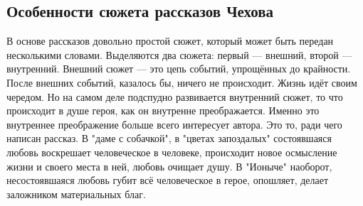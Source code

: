 \documentclass{article}
\begin{document}
\subsection{Особенности сюжета рассказов Чехова}

В основе рассказов довольно простой сюжет, который может быть передан несколькими словами. Выделяются два сюжета:
первый --- внешний, второй --- внутренний. Внешний сюжет --- это цепь событий, упрощённых до крайности. После внешних
событий, казалось бы, ничего не происходит. Жизнь идёт своим чередом. Но на самом деле подспудно развивается внутренний
сюжет, то что происходит в душе героя, как он внутренне преображается. Именно это внутреннее преображение больше всего
интересует автора. Это то, ради чего написан рассказ. В "даме с собачкой", в "цветах запоздалых" состоявшаяся любовь
воскрешает человеческое в человеке, происходит новое осмысление жизни и своего места в ней, любовь очищает душу.
В "Ионыче" наоборот, несостоявшаяся любовь губит всё человеческое в герое, опошляет, делает заложником материальных
благ. 
\end{document}
